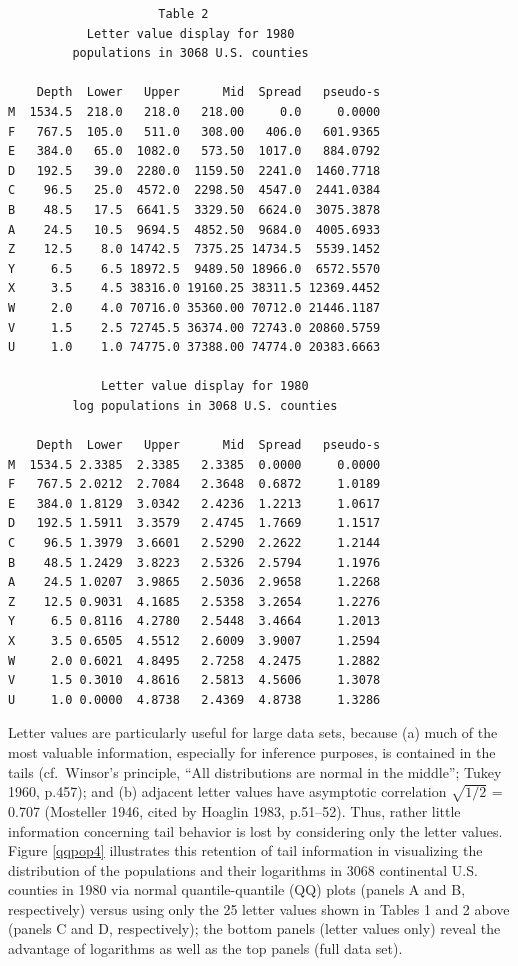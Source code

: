 \documentclass[oneside]{article}
\begin{document}
\begin{verbatim}
                     Table 2
           Letter value display for 1980
         populations in 3068 U.S. counties

    Depth  Lower   Upper      Mid  Spread   pseudo-s
M  1534.5  218.0   218.0   218.00     0.0     0.0000
F   767.5  105.0   511.0   308.00   406.0   601.9365
E   384.0   65.0  1082.0   573.50  1017.0   884.0792
D   192.5   39.0  2280.0  1159.50  2241.0  1460.7718
C    96.5   25.0  4572.0  2298.50  4547.0  2441.0384
B    48.5   17.5  6641.5  3329.50  6624.0  3075.3878
A    24.5   10.5  9694.5  4852.50  9684.0  4005.6933
Z    12.5    8.0 14742.5  7375.25 14734.5  5539.1452
Y     6.5    6.5 18972.5  9489.50 18966.0  6572.5570
X     3.5    4.5 38316.0 19160.25 38311.5 12369.4452
W     2.0    4.0 70716.0 35360.00 70712.0 21446.1187
V     1.5    2.5 72745.5 36374.00 72743.0 20860.5759
U     1.0    1.0 74775.0 37388.00 74774.0 20383.6663

             Letter value display for 1980
         log populations in 3068 U.S. counties

    Depth  Lower   Upper      Mid  Spread   pseudo-s
M  1534.5 2.3385  2.3385   2.3385  0.0000     0.0000
F   767.5 2.0212  2.7084   2.3648  0.6872     1.0189
E   384.0 1.8129  3.0342   2.4236  1.2213     1.0617
D   192.5 1.5911  3.3579   2.4745  1.7669     1.1517
C    96.5 1.3979  3.6601   2.5290  2.2622     1.2144
B    48.5 1.2429  3.8223   2.5326  2.5794     1.1976
A    24.5 1.0207  3.9865   2.5036  2.9658     1.2268
Z    12.5 0.9031  4.1685   2.5358  3.2654     1.2276
Y     6.5 0.8116  4.2780   2.5448  3.4664     1.2013
X     3.5 0.6505  4.5512   2.6009  3.9007     1.2594
W     2.0 0.6021  4.8495   2.7258  4.2475     1.2882
V     1.5 0.3010  4.8616   2.5813  4.5606     1.3078
U     1.0 0.0000  4.8738   2.4369  4.8738     1.3286
\end{verbatim}

Letter values are particularly useful for large data sets,
because (a) much of the most valuable information, especially
for inference purposes, is contained in the tails
(cf.~Winsor's principle, ``All distributions are normal
in the middle''; Tukey 1960, p.457); and (b) adjacent
letter values have asymptotic correlation $\sqrt{1/2}$ = 0.707
(Mosteller 1946, cited by Hoaglin 1983, p.51--52).
Thus, rather little information concerning tail behavior
is lost by considering only the letter values.  Figure \ref{qqpop4}
illustrates this retention of tail information in visualizing the
distribution of the populations and their logarithms
in 3068 continental U.S. counties in 1980 via
normal quantile-quantile (QQ) plots (panels A and B, respectively)
versus using only the 25 letter values shown in Tables 1 and 2 above
(panels C and D, respectively); the bottom panels (letter values only)
reveal the advantage of logarithms as well as the top panels (full data set).
\end{document}
